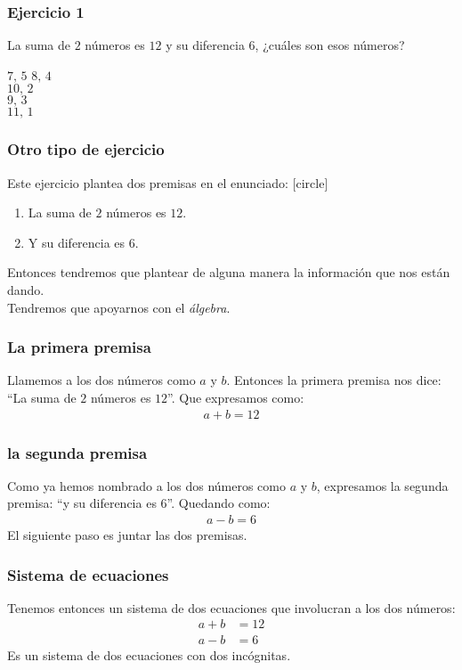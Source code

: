 \begin{frame}
\frametitle{Ejercicio 1}
La suma de $2$ números es $12$ y su diferencia $6$, ¿cuáles son esos números?
\begin{choices}
\choice $7,\, 5$
\choice $8, \, 4$ \\
\choice $10, \, 2$ \\
\choice $9, \, 3$ \\
\choice $11, \, 1$ \\
\end{choices}
\end{frame}
\begin{frame}
\frametitle{Otro tipo de ejercicio}
Este ejercicio plantea dos premisas en el enunciado:
[circle]
\begin{enumerate}[<+->]
\item La suma de $2$ números es $12$.
\item Y su diferencia es $6$.
\end{enumerate}
\pause
Entonces tendremos que plantear de alguna manera la información que nos están dando.
\\
\bigskip
\pause
Tendremos que apoyarnos con el \emph{álgebra}.
\end{frame}
\begin{frame}
\frametitle{La primera premisa}
Llamemos a los dos números como $a$ y $b$.
\pause
Entonces la primera premisa nos dice: \enquote{La suma de $2$ números es $12$}.
\pause
Que expresamos como:
\begin{align*}
a + b =  12
\end{align*}
\end{frame}
\begin{frame}
\frametitle{la segunda premisa}
Como ya hemos nombrado a los dos números como $a$ y $b$, expresamos la segunda premisa: \enquote{y su diferencia es $6$}. Quedando como:
\begin{align*}
a - b =  6
\end{align*}
\pause
El siguiente paso es juntar las dos premisas.
\end{frame}
\begin{frame}
\frametitle{Sistema de ecuaciones}
Tenemos entonces un sistema de dos ecuaciones que involucran a los dos números:
\begin{align*}
a + b &= 12 \\[0.5em]
a - b &= 6
\end{align*}
Es un sistema de dos ecuaciones con dos incógnitas.
\end{frame}

